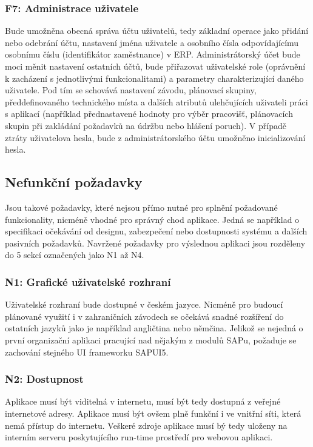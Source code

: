 \documentclass[thesis=M,czech]{FITthesis}[2012/06/26]
\begin{document}
\subsubsection{F7: Administrace uživatele}
Bude umožněna obecná správa účtu uživatelů, tedy základní operace jako přidání nebo odebrání účtu, nastavení jména uživatele a osobního čísla odpovídajícímu osobnímu číslu (identifikátor zaměstnance) v ERP. Administrátorský účet bude moci měnit nastavení ostatních účtů, bude přiřazovat uživatelské role (oprávnění k zacházení s jednotlivými funkcionalitami) a parametry charakterizující daného uživatele. Pod tím se schovává nastavení závodu, plánovací skupiny, předdefinovaného technického místa a dalších atributů ulehčujících uživateli práci s aplikací (například přednastavené hodnoty pro výběr pracovišť, plánovacích skupin při zakládání požadavků na údržbu nebo hlášení poruch). V případě ztráty uživatelova hesla, bude z administrátorského účtu umožněno inicializování hesla.

\subsection{Nefunkční požadavky}
Jsou takové požadavky, které nejsou přímo nutné pro splnění požadované funkcionality, nicméně vhodné pro správný chod aplikace. Jedná se například o specifikaci očekávání od designu, zabezpečení nebo dostupnosti systému a dalších pasivních požadavků. Navržené požadavky pro výslednou aplikaci jsou rozděleny do 5 sekcí označených jako N1 až N4.
\subsubsection{N1: Grafické uživatelské rozhraní}
Uživatelské rozhraní bude dostupné v českém jazyce. Nicméně pro budoucí plánované využití i v zahraničních závodech se očekává snadné rozšíření do ostatních jazyků jako je například angličtina nebo němčina. Jelikož se nejedná o první organizační aplikaci pracující nad nějakým z modulů SAPu, požaduje se zachování stejného UI frameworku SAPUI5.
\subsubsection{N2: Dostupnost}
Aplikace musí být viditelná v internetu, musí být tedy dostupná z veřejné internetové adresy. Aplikace musí být ovšem plně funkční i ve vnitřní síti, která nemá přístup do internetu. Veškeré zdroje aplikace musí bý tedy uloženy na interním serveru poskytujícího run-time prostředí pro webovou aplikaci.
\end{document}
